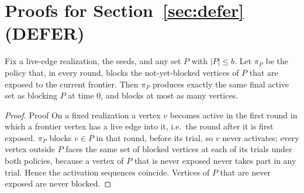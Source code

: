 \documentclass[ijoc,sglanonrev]{informs4}
\begin{document}
\ECSwitch
\ECDisclaimer
{}
\small

\section{Proofs for Section~\ref{sec:defer} (DEFER)}\label{ec:defer-proofs}

\begin{repeatlemma}
Fix a live-edge realization, the seeds, and any set $P$ with $|P|\le b$. Let
$\pi_P$ be the policy that, in every round, blocks the not-yet-blocked
vertices of $P$ that are exposed to the current frontier. Then $\pi_P$
produces exactly the same final active set as blocking $P$ at time $0$, and
blocks at most as many vertices.
\end{repeatlemma}
\begin{proof}{Proof}
On a fixed realization a vertex $v$ becomes active in the first round in
which a frontier vertex has a live edge into it, i.e.\ the round after it is
first exposed. $\pi_P$ blocks $v\in P$ in that round, before its trial, so
$v$ never activates; every vertex outside $P$ faces the same set of blocked
vertices at each of its trials under both policies, because a vertex of $P$
that is never exposed never takes part in any trial. Hence the activation
sequences coincide. Vertices of $P$ that are never exposed are never
blocked.\Halmos
\end{proof}
\end{document}
